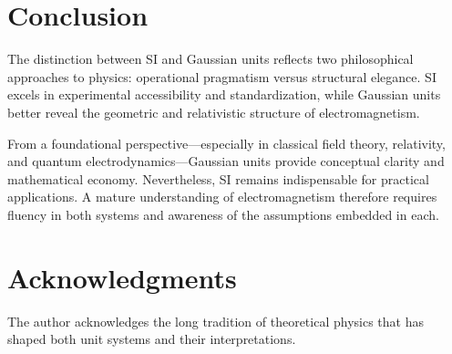 \documentclass[12pt]{article}
\begin{document}
\section{Conclusion}

The distinction between SI and Gaussian units reflects two philosophical approaches to physics: operational pragmatism versus structural elegance. SI excels in experimental accessibility and standardization, while Gaussian units better reveal the geometric and relativistic structure of electromagnetism.

From a foundational perspective—especially in classical field theory, relativity, and quantum electrodynamics—Gaussian units provide conceptual clarity and mathematical economy. Nevertheless, SI remains indispensable for practical applications. A mature understanding of electromagnetism therefore requires fluency in both systems and awareness of the assumptions embedded in each.

\section*{Acknowledgments}

The author acknowledges the long tradition of theoretical physics that has shaped both unit systems and their interpretations.
\end{document}
